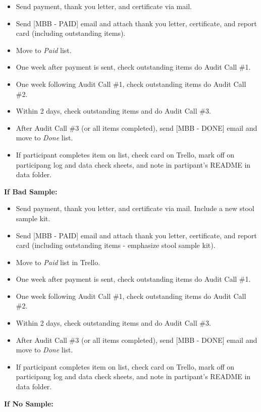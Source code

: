 \documentclass[
]{book}
\providecommand{\tightlist}{%
  \setlength{\itemsep}{0pt}\setlength{\parskip}{0pt}}
\begin{document}
\begin{itemize}
\tightlist
\item
  Send payment, thank you letter, and certificate via mail.
\item
  Send {[}MBB - PAID{]} email and attach thank you letter, certificate, and report card (including outstanding items).
\item
  Move to \emph{Paid} list.
\item
  One week after payment is sent, check outstanding items do Audit Call \#1.
\item
  One week following Audit Call \#1, check outstanding items do Audit Call \#2.
\item
  Within 2 days, check outstanding items and do Audit Call \#3.
\item
  After Audit Call \#3 (or all items completed), send {[}MBB - DONE{]} email and move to \emph{Done} list.
\item
  If participant completes item on list, check card on Trello, mark off on participang log and data check sheets, and note in partipant's README in data folder.
\end{itemize}

\textbf{If Bad Sample:}

\begin{itemize}
\tightlist
\item
  Send payment, thank you letter, and certificate via mail. Include a new stool sample kit.
\item
  Send {[}MBB - PAID{]} email and attach thank you letter, certificate, and report card (including outstanding items - emphasize stool sample kit).
\item
  Move to \emph{Paid} list in Trello.
\item
  One week after payment is sent, check outstanding items do Audit Call \#1.
\item
  One week following Audit Call \#1, check outstanding items do Audit Call \#2.
\item
  Within 2 days, check outstanding items and do Audit Call \#3.
\item
  After Audit Call \#3 (or all items completed), send {[}MBB - DONE{]} email and move to \emph{Done} list.
\item
  If participant completes item on list, check card on Trello, mark off on participang log and data check sheets, and note in partipant's README in data folder.
\end{itemize}

\textbf{If No Sample:}
\end{document}
